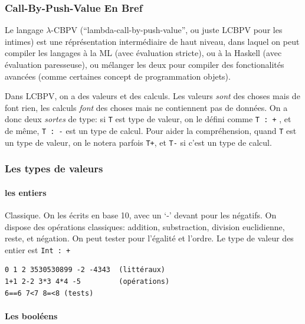 \documentclass[12pt]{article}
\begin{document}
\hypertarget{call-by-push-value-en-bref}{%
      \subsubsection*{Call-By-Push-Value En
            Bref}\label{call-by-push-value-en-bref}}

Le langage $\lambda$-CBPV (``lambda-call-by-push-value'', ou juste LCBPV pour
les intimes) est une réprésentation intermédiaire de haut niveau, dans
laquel on peut compiler les langages à la ML (avec évaluation stricte),
ou à la Haskell (avec évaluation paresseuse), ou mélanger les deux pour
compiler des fonctionalités avancées (comme certaines concept de
programmation objets).

Dans LCBPV, on a des valeurs et des calculs. Les valeurs \emph{sont} des
choses mais de font rien, les calculs \emph{font} des choses mais ne
contiennent pas de données. On a donc deux \emph{sortes} de type: si
\texttt{T} est type de valeur, on le défini comme \texttt{T\ :\ +} , et
de même, \texttt{T\ :\ -} est un type de calcul. Pour aider la
compréhension, quand \texttt{T} est un type de valeur, on le notera
parfois \texttt{T+}, et \texttt{T-} si c'est un type de calcul.

\hypertarget{les-types-de-valeurs}{%
      \subsubsection*{Les types de valeurs}\label{les-types-de-valeurs}}

\hypertarget{les-entiers}{%
      \paragraph*{les entiers}\label{les-entiers}}

Classique. On les écrits en base 10, avec un `-' devant pour les
négatifs. On dispose des opérations classiques: addition, substraction,
division euclidienne, reste, et négation. On peut tester pour l'égalité
et l'ordre. Le type de valeur des entier est \texttt{Int\ :\ +}

\begin{verbatim}
0 1 2 3530530899 -2 -4343  (littéraux)
1+1 2-2 3*3 4*4 -5         (opérations)
6==6 7<7 8=<8 (tests)
\end{verbatim}

\hypertarget{les-booluxe9ens}{%
      \paragraph*{Les booléens}\label{les-booluxe9ens}}
\end{document}
